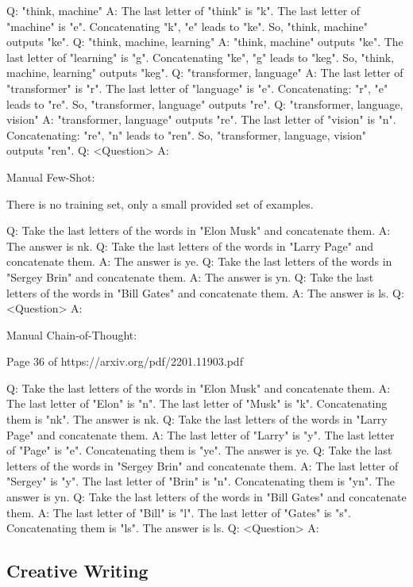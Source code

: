 \documentclass[11pt]{article}
\begin{document}
Q: "think, machine"
A: The last letter of "think" is "k". The last letter of "machine" is "e". Concatenating "k", "e" leads to
"ke". So, "think, machine" outputs "ke".
Q: "think, machine, learning"
A: "think, machine" outputs "ke". The last letter of "learning" is "g". Concatenating "ke", "g" leads to
"keg". So, "think, machine, learning" outputs "keg".
Q: "transformer, language"
A: The last letter of "transformer" is "r". The last letter of "language" is "e". Concatenating: "r", "e"
leads to "re". So, "transformer, language" outputs "re".
Q: "transformer, language, vision"
A: "transformer, language" outputs "re". The last letter of "vision" is "n". Concatenating: "re", "n" leads
to "ren". So, "transformer, language, vision" outputs "ren".
Q: <Question>
A: 

Manual Few-Shot:

There is no training set, only a small provided set of examples.

Q: Take the last letters of the words in "Elon Musk" and concatenate them.
A: The answer is nk.
Q: Take the last letters of the words in "Larry Page" and concatenate them.
A: The answer is ye.
Q: Take the last letters of the words in "Sergey Brin" and concatenate them.
A: The answer is yn.
Q: Take the last letters of the words in "Bill Gates" and concatenate them.
A: The answer is ls.
Q: <Question>
A: 

Manual Chain-of-Thought:

Page 36 of https://arxiv.org/pdf/2201.11903.pdf

Q: Take the last letters of the words in "Elon Musk" and concatenate them.
A: The last letter of "Elon" is "n". The last letter of "Musk" is "k". Concatenating them is "nk". The answer is nk.
Q: Take the last letters of the words in "Larry Page" and concatenate them.
A: The last letter of "Larry" is "y". The last letter of "Page" is "e". Concatenating them is "ye". The answer is ye.
Q: Take the last letters of the words in "Sergey Brin" and concatenate them.
A: The last letter of "Sergey" is "y". The last letter of "Brin" is "n". Concatenating them is "yn". The answer is yn.
Q: Take the last letters of the words in "Bill Gates" and concatenate them.
A: The last letter of "Bill" is "l". The last letter of "Gates" is "s". Concatenating them is "ls". The answer is ls.
Q: <Question>
A: 

\subsection{Creative Writing}
\end{document}
